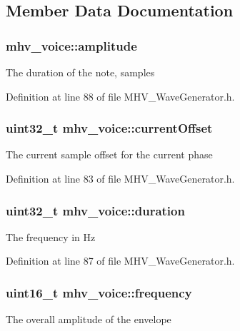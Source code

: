 \subsection{Member Data Documentation}
\hypertarget{structmhv__voice_a23c0a77a91913bf94930bb9f0e9fc28b}{
\subsubsection[{amplitude}]{ mhv\-\_\-voice\-::amplitude}}\label{structmhv__voice_a23c0a77a91913bf94930bb9f0e9fc28b}
The duration of the note, samples 

Definition at line 88 of file M\-H\-V\-\_\-\-Wave\-Generator.\-h.

\hypertarget{structmhv__voice_a338eb6b52bea8bcedc46dab7e854d138}{
\subsubsection[{current\-Offset}]{\setlength{\rightskip}{0pt plus 5cm}uint32\-\_\-t mhv\-\_\-voice\-::current\-Offset}}\label{structmhv__voice_a338eb6b52bea8bcedc46dab7e854d138}
The current sample offset for the current phase 

Definition at line 83 of file M\-H\-V\-\_\-\-Wave\-Generator.\-h.

\hypertarget{structmhv__voice_a1e3b7b6c0a725010eb983f606e93079d}{
\subsubsection[{duration}]{\setlength{\rightskip}{0pt plus 5cm}uint32\-\_\-t mhv\-\_\-voice\-::duration}}\label{structmhv__voice_a1e3b7b6c0a725010eb983f606e93079d}
The frequency in Hz 

Definition at line 87 of file M\-H\-V\-\_\-\-Wave\-Generator.\-h.

\hypertarget{structmhv__voice_a4b98f1d1e32ae313d6f30b9f6a32d2fd}{
\subsubsection[{frequency}]{\setlength{\rightskip}{0pt plus 5cm}uint16\-\_\-t mhv\-\_\-voice\-::frequency}}\label{structmhv__voice_a4b98f1d1e32ae313d6f30b9f6a32d2fd}
The overall amplitude of the envelope 

